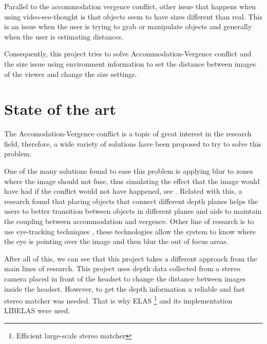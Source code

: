 \documentclass[10pt,a4paper,twocolumn,twoside]{article}
\begin{document}
	Parallel to the accommodation vergence conflict, other issue that happens when using video-see-thought is that objects seem to have sizes different than real. This is an issue when the user is trying to grab or manipulate objects and generally when the user is estimating distances.
	
	Consequently, this project tries to solve Accommodation-Vergence conflict and the size issue using environment information to set the distance between images of the viewer and change the size settings.
	
		
	\section{State of the art}
	The Accomodation-Vergence conflict is a topic of great interest in the research field, therefore, a wide variety of  solutions have been proposed to try to solve this problem. 
	
	One of the many solutions found to ease this problem is applying blur to zones where the image should not fuse, thus simulating the effect that the image would have had if the conflict would not have happened, see \cite{neareyeblur}. Related with this, a research \cite{sceneComposition} found that placing objects that connect different depth planes helps the users to better transition between objects in different planes and aids to maintain the coupling between accommodation and vergence. Other line of research is to use eye-tracking techniques \cite{eyeTracking}, these technologies allow the system to know where the eye is pointing over the image and then blur the out of focus areas. 
	
	After all of this, we can see that this project takes a different approach from the main lines of research.  This project uses depth data collected from a stereo camera placed in front of the headset to change the distance between images inside the headset. However, to get the depth information a reliable and fast stereo matcher was needed. That is why ELAS \footnote{Efficient large-scale stereo matcher} \cite{LIBELAS} and its implementation LIBELAS were used.  
		
\end{document}
